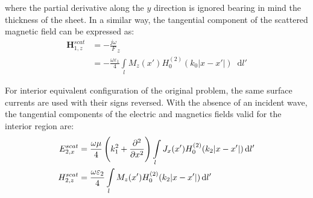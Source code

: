 \documentclass[11pt]{article}
\renewcommand{\v}[1]{\mathbf{#1}} %
\renewcommand{\O}{\omega}  %
\newcommand{\E}{\varepsilon}  %
\renewcommand{\u}{\mu}  %
\renewcommand{\^}{\hat}  %
\newcommand*\diff{\mathop{}\!\mathrm{d}} %
\begin{document}
%
where the partial derivative along the $y$ direction is ignored bearing in mind the thickness of the sheet. In a similar way, the tangential component of the scattered magnetic field can be expressed as:
%
\begin{equation}
  \begin{split}
    \v H_{1,z}^{scat} &= -\frac{j \O} F_z \\
    &= -\frac{\O \E_1}{4} \int\limits_{l} M_z(x') H_0^{(2)}(k_0 |x - x'|) \diff{l'}
  \end{split}
  \label{eq:H1sc}
\end{equation}

For interior equivalent configuration of the original problem, the same surface currents are used with their signs reversed. With the absence of an incident wave, the tangential components of the electric and magnetics fields valid for the interior region are:
%
\begin{subequations}
  \begin{align}
    E_{2,x}^{scat} &= \frac{\O \u}{4} \left(k_1^2 +  \pdv[2]{}{x} \right) \int\limits_{l} J_x(x')  H_0^{(2)}(k_2 |x - x'|) \diff{l'}
    \label{eq:E2sc}\\
    H_{2,z}^{scat} &= \frac{\O \E_2}{4} \int\limits_{l} M_z(x') H_0^{(2)}(k_2 |x - x'|) \diff{l'}
    \label{eq:H2sc}
  \end{align}
  \label{eq:2sc}
\end{subequations}
\end{document}
